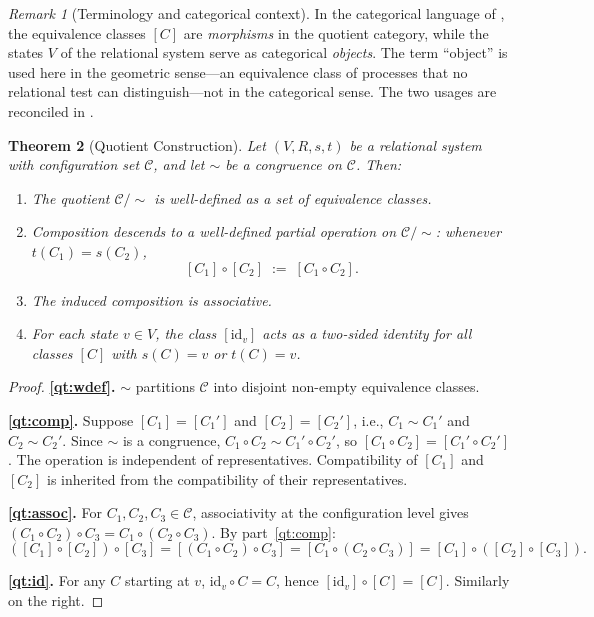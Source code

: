 \documentclass{article}
\newtheorem{theorem}{Theorem}[section]
\theoremstyle{definition}
\theoremstyle{remark}
\newtheorem{remark}[theorem]{Remark}
\newcommand{\RC}{\mathcal{C}}
\newcommand{\id}{\mathrm{id}}
\begin{document}
\begin{remark}[Terminology and categorical context]
\label{rem:objmorph}
In the categorical language of , the equivalence
classes $[C]$ are \emph{morphisms} in the quotient category, while
the states $V$ of the relational system serve as categorical
\emph{objects}. The term ``object'' is used here in the geometric
sense---an equivalence class of processes that no relational test
can distinguish---not in the categorical sense. The two usages are
reconciled in .
\end{remark}

\begin{theorem}[Quotient Construction]
\label{thm:quotient}
Let $(V, R, s, t)$ be a relational system with configuration
set $\RC$, and let $\sim$ be a congruence on $\RC$. Then:
\begin{enumerate}[label=(\roman*)]
  \item\label{qt:wdef} The quotient $\RC/{\sim}$ is well-defined
        as a set of equivalence classes.
  \item\label{qt:comp} Composition descends to a well-defined
        partial operation on $\RC/{\sim}$: whenever $t(C_1) = s(C_2)$,
        \[
          [C_1] \circ [C_2] \;:=\; [C_1 \circ C_2].
        \]
  \item\label{qt:assoc} The induced composition is associative.
  \item\label{qt:id} For each state $v \in V$, the class $[\id_v]$
        acts as a two-sided identity for all classes $[C]$ with
        $s(C) = v$ or $t(C) = v$.
\end{enumerate}
\end{theorem}

\begin{proof}
\textbf{\ref{qt:wdef}.} $\sim$ partitions $\RC$ into disjoint
non-empty equivalence classes.

\textbf{\ref{qt:comp}.} Suppose $[C_1] = [C_1']$ and
$[C_2] = [C_2']$, i.e., $C_1 \sim C_1'$ and $C_2 \sim C_2'$.
Since $\sim$ is a congruence, $C_1 \circ C_2 \sim C_1' \circ C_2'$,
so $[C_1 \circ C_2] = [C_1' \circ C_2']$. The operation is
independent of representatives. Compatibility of $[C_1]$ and
$[C_2]$ is inherited from the compatibility of their
representatives.

\textbf{\ref{qt:assoc}.} For $C_1, C_2, C_3 \in \RC$, associativity
at the configuration level gives
$(C_1 \circ C_2) \circ C_3 = C_1 \circ (C_2 \circ C_3)$.
By part~\ref{qt:comp}:
\[
  ([C_1] \circ [C_2]) \circ [C_3]
  = [(C_1 \circ C_2) \circ C_3]
  = [C_1 \circ (C_2 \circ C_3)]
  = [C_1] \circ ([C_2] \circ [C_3]).
\]

\textbf{\ref{qt:id}.} For any $C$ starting at $v$,
$\id_v \circ C = C$, hence $[\id_v] \circ [C] = [C]$.
Similarly on the right.
\end{proof}
\end{document}
